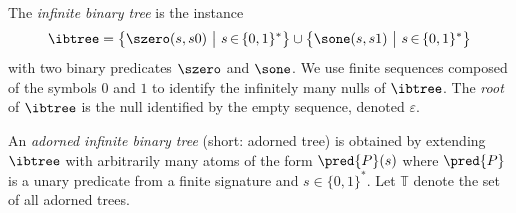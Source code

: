 \begin{definition}
	The \emph{infinite binary tree} is the instance
	$$\ibtree = 
    \big\{\szero(s,s0) \ \big| \ s {\,\in\,} \{0,1\}^*\big\} \cup 
	\big\{ \sone(s,s1) \ \big| \ s {\,\in\,} \{0,1\}^*\big\}
	$$%
	with two binary predicates $\szero$ and $\sone$.
	We use finite sequen\-ces composed of the symbols $0$ and $1$ to identify the infinitely many nulls of $\ibtree$. The \emph{root} of $\ibtree$ is the null identified by the empty sequence, denoted $\varepsilon$.

    An \emph{adorned infinite binary tree} (short: adorned tree) is obtained by extending $\ibtree$ with arbitrarily many atoms of the form $\pred{P}(s)$ where $\pred{P}$ is a unary predicate from a finite signature and $s \in \{0,1\}^*$. Let $\mathbb{T}$ denote the set of all adorned trees. 
%
\end{definition}

